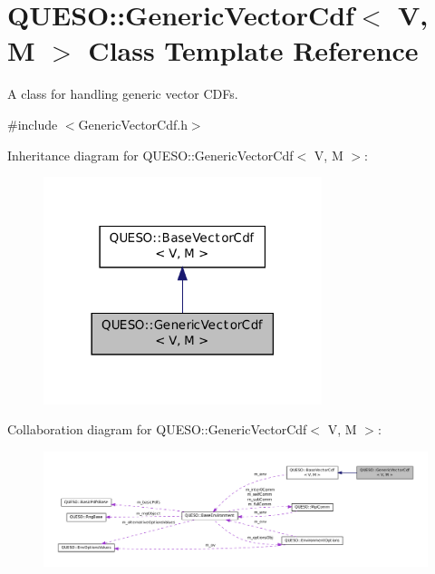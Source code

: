 \hypertarget{class_q_u_e_s_o_1_1_generic_vector_cdf}{\section{Q\-U\-E\-S\-O\-:\-:Generic\-Vector\-Cdf$<$ V, M $>$ Class Template Reference}
\label{class_q_u_e_s_o_1_1_generic_vector_cdf}
}


A class for handling generic vector C\-D\-Fs.  




{\ttfamily \#include $<$Generic\-Vector\-Cdf.\-h$>$}



Inheritance diagram for Q\-U\-E\-S\-O\-:\-:Generic\-Vector\-Cdf$<$ V, M $>$\-:
\nopagebreak
\begin{figure}[H]
\begin{center}
\leavevmode
\includegraphics[width=230pt]{class_q_u_e_s_o_1_1_generic_vector_cdf__inherit__graph}
\end{center}
\end{figure}


Collaboration diagram for Q\-U\-E\-S\-O\-:\-:Generic\-Vector\-Cdf$<$ V, M $>$\-:
\nopagebreak
\begin{figure}[H]
\begin{center}
\leavevmode
\includegraphics[width=350pt]{class_q_u_e_s_o_1_1_generic_vector_cdf__coll__graph}
\end{center}
\end{figure}
